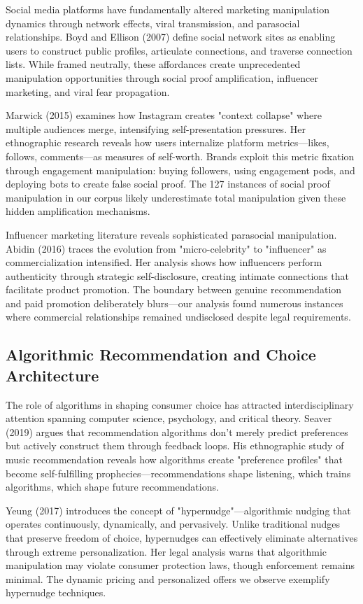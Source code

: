Social media platforms have fundamentally altered marketing manipulation dynamics through network effects, viral transmission, and parasocial relationships. Boyd and Ellison (2007) define social network sites as enabling users to construct public profiles, articulate connections, and traverse connection lists. While framed neutrally, these affordances create unprecedented manipulation opportunities through social proof amplification, influencer marketing, and viral fear propagation.

Marwick (2015) examines how Instagram creates "context collapse" where multiple audiences merge, intensifying self-presentation pressures. Her ethnographic research reveals how users internalize platform metrics—likes, follows, comments—as measures of self-worth. Brands exploit this metric fixation through engagement manipulation: buying followers, using engagement pods, and deploying bots to create false social proof. The 127 instances of social proof manipulation in our corpus likely underestimate total manipulation given these hidden amplification mechanisms.

Influencer marketing literature reveals sophisticated parasocial manipulation. Abidin (2016) traces the evolution from "micro-celebrity" to "influencer" as commercialization intensified. Her analysis shows how influencers perform authenticity through strategic self-disclosure, creating intimate connections that facilitate product promotion. The boundary between genuine recommendation and paid promotion deliberately blurs—our analysis found numerous instances where commercial relationships remained undisclosed despite legal requirements.

\subsection{Algorithmic Recommendation and Choice Architecture}

The role of algorithms in shaping consumer choice has attracted interdisciplinary attention spanning computer science, psychology, and critical theory. Seaver (2019) argues that recommendation algorithms don't merely predict preferences but actively construct them through feedback loops. His ethnographic study of music recommendation reveals how algorithms create "preference profiles" that become self-fulfilling prophecies—recommendations shape listening, which trains algorithms, which shape future recommendations.

Yeung (2017) introduces the concept of "hypernudge"—algorithmic nudging that operates continuously, dynamically, and pervasively. Unlike traditional nudges that preserve freedom of choice, hypernudges can effectively eliminate alternatives through extreme personalization. Her legal analysis warns that algorithmic manipulation may violate consumer protection laws, though enforcement remains minimal. The dynamic pricing and personalized offers we observe exemplify hypernudge techniques.

